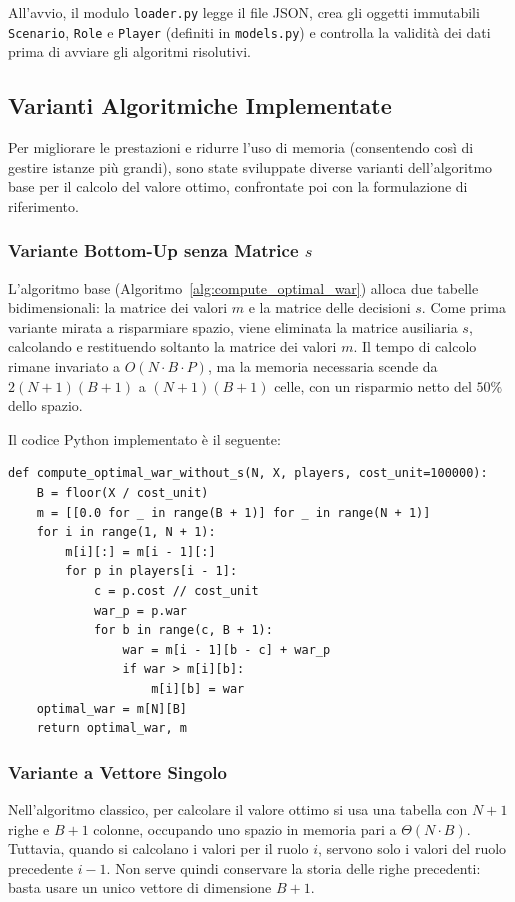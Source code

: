 All'avvio, il modulo \texttt{loader.py} legge il file JSON, crea gli oggetti immutabili \texttt{Scenario}, \texttt{Role} e \texttt{Player} (definiti in \texttt{models.py}) e controlla la validità dei dati prima di avviare gli algoritmi risolutivi.

\subsection{Varianti Algoritmiche Implementate}
Per migliorare le prestazioni e ridurre l'uso di memoria (consentendo così di gestire istanze più grandi), sono state sviluppate diverse varianti dell'algoritmo base per il calcolo del valore ottimo, confrontate poi con la formulazione di riferimento.

\subsubsection{Variante Bottom-Up senza Matrice \texorpdfstring{$s$}{s}}
L'algoritmo base (Algoritmo~\ref{alg:compute_optimal_war}) alloca due tabelle bidimensionali: la matrice dei valori $m$ e la matrice delle decisioni $s$. Come prima variante mirata a risparmiare spazio, viene eliminata la matrice ausiliaria $s$, calcolando e restituendo soltanto la matrice dei valori $m$. Il tempo di calcolo rimane invariato a $O(N \cdot B \cdot P)$, ma la memoria necessaria scende da $2(N + 1)(B + 1)$ a $(N + 1)(B + 1)$ celle, con un risparmio netto del $50\%$ dello spazio.

Il codice Python implementato è il seguente:

\noindent\begin{minipage}{\linewidth}
\begin{lstlisting}
def compute_optimal_war_without_s(N, X, players, cost_unit=100000):
    B = floor(X / cost_unit)
    m = [[0.0 for _ in range(B + 1)] for _ in range(N + 1)]
    for i in range(1, N + 1):
        m[i][:] = m[i - 1][:]
        for p in players[i - 1]:
            c = p.cost // cost_unit
            war_p = p.war
            for b in range(c, B + 1):
                war = m[i - 1][b - c] + war_p
                if war > m[i][b]:
                    m[i][b] = war
    optimal_war = m[N][B]
    return optimal_war, m
\end{lstlisting}
\end{minipage}

\subsubsection{Variante a Vettore Singolo}
Nell'algoritmo classico, per calcolare il valore ottimo si usa una tabella con $N+1$ righe e $B+1$ colonne, occupando uno spazio in memoria pari a $\Theta(N \cdot B)$. Tuttavia, quando si calcolano i valori per il ruolo $i$, servono solo i valori del ruolo precedente $i-1$. Non serve quindi conservare la storia delle righe precedenti: basta usare un unico vettore di dimensione $B+1$.

